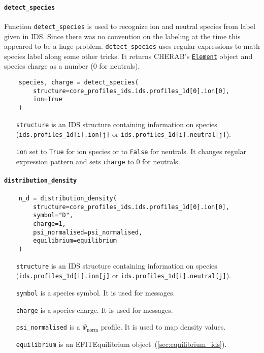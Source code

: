\documentclass[../main.tex]{subfiles}
\begin{document}
\paragraph{\texttt{detect\_species}}%
\label{par:detect_species}

Function \texttt{detect\_species} is used to recognize ion and neutral species from label given in IDS. Since there was no convention on the labeling at the time this appeared to be a huge problem. \texttt{detect\_species} uses regular expressions to math species label along some other tricks. It returns CHERAB's \href{https://cherab.github.io/documentation/atomic/elements_and_isotopes.html?highlight=element#cherab.core.atomic.elements.Element}{\texttt{Element}} object and species charge as a number (0 for neutrals).

\begin{verbatim}
    species, charge = detect_species(
        structure=core_profiles_ids.ids.profiles_1d[0].ion[0],
        ion=True
    )
\end{verbatim}

\begin{itemize}[align=left]
    \item[\texttt{structure}] is an IDS structure containing information on species (\texttt{ids.profiles\_1d[i].ion[j]} or \texttt{ids.profiles\_1d[i].neutral[j]}).
    \item[\texttt{ion}] set to \texttt{True} for ion species or to \texttt{False} for neutrals. It changes regular expression pattern and sets \texttt{charge} to 0 for neutrals.
\end{itemize}

\paragraph{\texttt{distribution\_density}}%
\label{par:distribution_density}

\begin{verbatim}
    n_d = distribution_density(
        structure=core_profiles_ids.ids.profiles_1d[0].ion[0],
        symbol="D",
        charge=1,
        psi_normalised=psi_normalised,
        equilibrium=equilibrium
    )
\end{verbatim}

\begin{itemize}[align=left]
    \item[\texttt{structure}] is an IDS structure containing information on species (\texttt{ids.profiles\_1d[i].ion[j]} or \texttt{ids.profiles\_1d[i].neutral[j]}).
    \item[\texttt{symbol}] is a species symbol. It is used for messages.
    \item[\texttt{charge}] is a species charge. It is used for messages.
    \item[\texttt{psi\_normalised}] is a $\Psi_\text{norm}$ profile. It is used to map density values.
    \item[\texttt{equilibrium}] is an EFITEquilibrium object~(\cref{sec:equilibrium_ids}).
\end{itemize}
\end{document}
